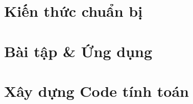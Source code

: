 \documentclass[a4paper,oneside,12pt]{report}
\begin{document}

\thispagestyle{empty}
\cleardoublepage
{}



\cleardoublepage
{}

\chapter{Kiến thức chuẩn bị}





\chapter{Bài tập \& Ứng dụng}


\chapter{Xây dựng Code tính toán}

\end{document}
